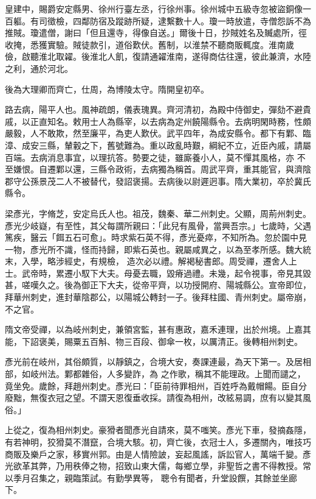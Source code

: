 \begin{pinyinscope}
 皇建中，賜爵安定縣男、徐州行臺左丞，行徐州事。徐州城中五級寺忽被盜銅像一百軀。有司徵檢，四鄰防宿及蹤跡所疑，逮繫數十人。瓊一時放遣，寺僧怨訴不為推賊。瓊遣僧，謝曰「但且還寺，得像自送。」爾後十日，抄賊姓名及贓處所，徑收掩，悉獲實驗。賊徒款引，道俗歎伏。舊制，以淮禁不聽商販輒度。淮南歲
 儉，啟聽淮北取糴。後淮北人飢，復請通糴淮南，遂得商估往還，彼此兼濟，水陸之利，通於河北。



 後為大理卿而齊亡，仕周，為博陵太守。隋開皇初卒。



 路去病，陽平人也。風神疏朗，儀表瑰異。齊河清初，為殿中侍御史，彈劾不避貴戚，以正直知名。敕用士人為縣宰，以去病為定州饒陽縣令。去病明閑時務，性頗嚴毅，人不敢欺，然至廉平，為吏人歎伏。武平四年，為成安縣令。都下有鄴、臨漳、成安三縣，輦轂之下，舊號難為。重以政亂時艱，綱紀不立，近臣內戚，請屬百端。去病消息事宜，以理抗答。勢要之徒，雖廝養小人，莫不憚其風格，亦
 不至嫌恨。自遷鄴以還，三縣令政術，去病獨為稱首。周武平齊，重其能官，與濟陰郡守公孫景茂二人不被替代，發詔褒揚。去病後以尉遲迥事。隋大業初，卒於冀氏縣令。



 梁彥光，字脩芝，安定烏氏人也。祖茂，魏秦、華二州刺史。父顯，周荊州刺史。彥光少岐嶷，有至性，其父每謂所親曰：「此兒有風骨，當興吾宗。」七歲時，父遇篤疾，醫云「餌五石可愈」。時求紫石英不得，彥光憂瘁，不知所為。忽於園中見一物，彥光所不識，怪而持歸，即紫石英也。親屬咸異之，以為至孝所感。魏大統末，入學，略涉經史，有規檢，
 造次必以禮。解褐秘書郎。周受禪，遷舍人上士。武帝時，累遷小馭下大夫。母憂去職，毀瘠過禮。未幾，起令視事，帝見其毀甚，嗟嘆久之。後為御正下大夫，從帝平齊，以功授開府、陽城縣公。宣帝即位，拜華州刺史，進封華陰郡公，以陽城公轉封一子。後拜柱國、青州刺史。屬帝崩，不之官。



 隋文帝受禪，以為岐州刺史，兼領宮監，甚有惠政，嘉禾連理，出於州境。上嘉其能，下詔褒美，賜粟五百斛、物三百段、御傘一枚，以厲清正。後轉相州刺史。



 彥光前在岐州，其俗頗質，以靜鎮之，合境大安，奏課連最，為天下第一。及居相部，如岐州法。鄴都雜俗，人多變詐，為
 之作歌，稱其不能理政。上聞而譴之，竟坐免。歲餘，拜趙州刺史。彥光曰：「臣前待罪相州，百姓呼為戴帽餳。臣自分廢黜，無復衣冠之望。不謂天恩復垂收採。請復為相州，改絃易調，庶有以變其風俗。」



 上從之，復為相州刺史。豪猾者聞彥光自請來，莫不嗤笑。彥光下車，發摘姦隱，有若神明，狡猾莫不潛竄，合境大駭。初，齊亡後，衣冠士人，多遷關內，唯技巧商販及樂戶之家，移實州郭。由是人情險詖，妄起風謠，訴訟官人，萬端千變。彥光欲革其弊，乃用秩俸之物，招致山東大儒，每鄉立學，非聖哲之書不得教授。常以季月召集之，親臨策試。有勤學異等，
 聰令有聞者，升堂設饌，其餘並坐廊下。




\end{pinyinscope}
